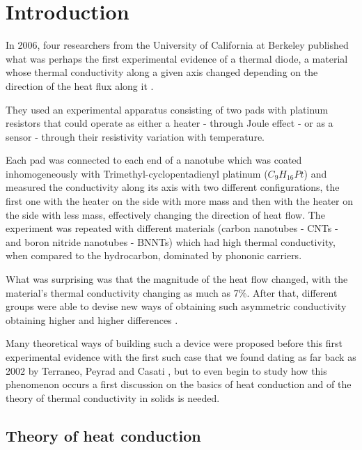 
\chapter{Introduction}
	

In 2006, four researchers from the University of California at Berkeley published what was perhaps the first experimental evidence of a thermal diode, a material whose thermal conductivity along a given axis changed depending on the direction of the heat flux along it \cite{changSolidStateThermal2006}.

They used an experimental apparatus consisting of two pads with platinum resistors that could operate as either a heater - through Joule effect - or as a sensor - through their resistivity variation with temperature. 

Each pad was connected to each end of a nanotube which was coated inhomogeneously with Trimethyl-cyclopentadienyl platinum ($ C_{9}H_{16}Pt $) and measured the conductivity along its axis with two different configurations, the first one with the heater on the side with more mass and then with the heater on the side with less mass, effectively changing the direction of heat flow. The experiment was repeated with different materials (carbon nanotubes - CNTs - and boron nitride nanotubes - BNNTs) which had high thermal conductivity, when compared to the hydrocarbon, dominated by phononic carriers.

What was surprising was that the magnitude of the heat flow changed, with the material's thermal conductivity changing as much as 7\%. After that, different groups were able to devise new ways of obtaining such asymmetric conductivity obtaining higher and higher differences \cite{kobayashiOxideThermal2009, martinez-perezRectificationElectronic2015}.

Many theoretical ways of building such a device were proposed before this first experimental evidence with the first such case that we found dating as far back as 2002 by Terraneo, Peyrad and Casati \cite{terraneoControllingEnergy2002}, but to even begin to study how this phenomenon occurs a first discussion on the basics of heat conduction and of the theory of thermal conductivity in solids is needed.

\section{Theory of heat conduction}

